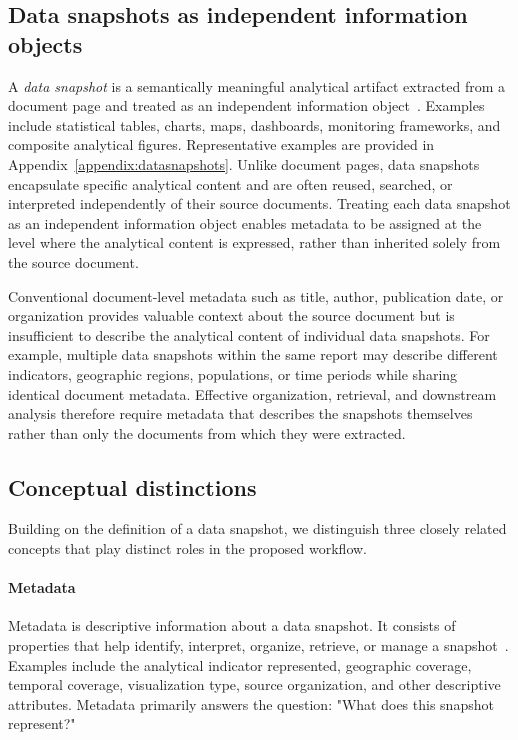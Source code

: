 \documentclass{article}
\begin{document}
\subsection{Data snapshots as independent information objects}

A \emph{data snapshot} is a semantically meaningful analytical artifact extracted from a document page and treated as an independent information object~\citep{dy2026}. Examples include statistical tables, charts, maps, dashboards, monitoring frameworks, and composite analytical figures. Representative examples are provided in Appendix~\ref{appendix:datasnapshots}. Unlike document pages, data snapshots encapsulate specific analytical content and are often reused, searched, or interpreted independently of their source documents. Treating each data snapshot as an independent information object enables metadata to be assigned at the level where the analytical content is expressed, rather than inherited solely from the source document.

Conventional document-level metadata such as title, author, publication date, or organization provides valuable context about the source document but is insufficient to describe the analytical content of individual data snapshots. For example, multiple data snapshots within the same report may describe different indicators, geographic regions, populations, or time periods while sharing identical document metadata. Effective organization, retrieval, and downstream analysis therefore require metadata that describes the snapshots themselves rather than only the documents from which they were extracted.

\subsection{Conceptual distinctions}

Building on the definition of a data snapshot, we distinguish three closely related concepts that play distinct roles in the proposed workflow.

\paragraph{Metadata}

Metadata is descriptive information about a data snapshot. It consists of properties that help identify, interpret, organize, retrieve, or manage a snapshot~\citep{gilliland2008}. Examples include the analytical indicator represented, geographic coverage, temporal coverage, visualization type, source organization, and other descriptive attributes. Metadata primarily answers the question: "What does this snapshot represent?"
\end{document}
